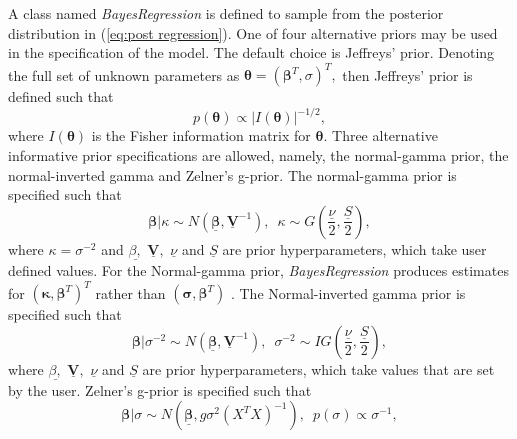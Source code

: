 \documentclass[article]{jss}
\begin{document}
A class named \emph{BayesRegression }is defined to sample from the
posterior distribution in (\ref{eq:post regression}). One of four
alternative priors may be used in the specification of the model.  The
default choice is Jeffreys' prior. Denoting the full set of unknown
parameters as $\bm{\theta}=(\bm{\beta}^{T},\sigma)^{T},$ then
Jeffreys' prior is defined such that \begin{equation}
  p(\bm{\theta})\propto|I(\bm{\theta})|^{-1/2},\label{eq:Jeffrey's
    Prior}\end{equation} where $I(\bm{\theta})$ is the Fisher
information matrix for $\bm{\theta}.$ Three alternative informative
prior specifications are allowed, namely, the normal-gamma prior, the
normal-inverted gamma and Zelner's g-prior.  The normal-gamma prior is
specified such that\begin{equation} \bm{\beta}|\kappa\sim
  N(\bm{\underline{\beta}},\underline{\bm{V}}^{-1}),\,\,\,\kappa\sim
  G\left(\frac{\underline{\nu}}{2},\frac{\underline{S}}{2}\right),\label{eq:Normal
    Gamma}\end{equation} where $\kappa=\sigma^{-2}$ and
$\underline{\beta,}$ $\underline{\bm{V}},$ $\underline{\nu}$ and
$\underline{S}$ are prior hyperparameters, which take user defined
values. For the Normal-gamma prior, \emph{BayesRegression }produces
estimates for\emph{ $\left(\bm{\kappa,\beta}^{T}\right)^{T}$ }rather
than $\left(\bm{\sigma,\beta}^{T}\right)$ . The Normal-inverted gamma
prior is specified such that\begin{equation}
  \bm{\beta}|\sigma^{-2}\sim
  N(\bm{\underline{\beta}},\underline{\bm{V}}^{-1}),\,\,\,\sigma^{-2}\sim
  IG\left(\frac{\underline{\nu}}{2},\frac{\underline{S}}{2}\right),\label{eq:Normal
    Inverted Gamma}\end{equation} where $\underline{\beta,}$
$\underline{\bm{V}},$ $\underline{\nu}$ and $\underline{S}$ are prior
hyperparameters, which take values that are set by the user. Zelner's
g-prior is specified such that\begin{equation} \bm{\beta}|\sigma\sim
  N\left(\underline{\bm{\beta}},g\sigma^{2}\left(X^{T}X\right)^{-1}\right),\,\,\,
  p(\sigma)\propto\sigma^{-1},\label{eq:g-prior}\end{equation}
\end{document}
